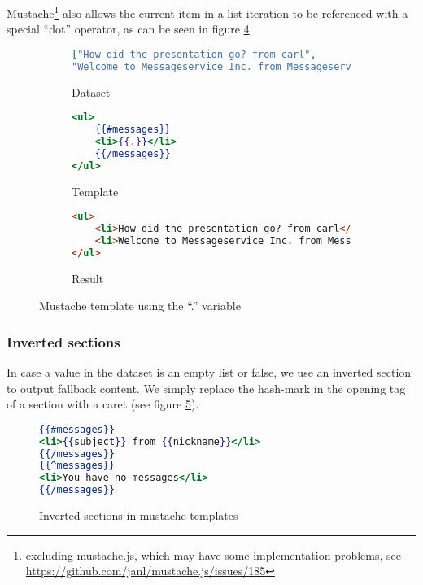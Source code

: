 \documentclass[thesis.tex]{subfiles}
\begin{document}
Mustache\footnote{excluding mustache.js, which may have some implementation
problems, see \url{https://github.com/janl/mustache.js/issues/185}} also allows
the current item in a list iteration to be referenced with a special ``dot''
operator, as can be seen in figure \ref{fig:dot-oper-example}.
\begin{figure}
	\centering
	\begin{subfigure}{\textwidth}
		\caption{Dataset}
		\label{fig:dot-oper-example.json}
		\begin{lstlisting}[language=JSON]
["How did the presentation go? from carl",
"Welcome to Messageservice Inc. from Messageservice Inc."]
		\end{lstlisting}
	\end{subfigure}
	
	\begin{subfigure}{\textwidth}
		\caption{Template}
		\label{fig:dot-oper-example.mustache}
		\begin{lstlisting}[language=mustache]
<ul>
	{{#messages}}
	<li>{{.}}</li>
	{{/messages}}
</ul>
		\end{lstlisting}
	\end{subfigure}
	
	\begin{subfigure}{\textwidth}
		\caption{Result}
		\label{fig:dot-oper-example.html}
		\begin{lstlisting}[language=HTML]
<ul>
	<li>How did the presentation go? from carl</li>
	<li>Welcome to Messageservice Inc. from Messageservice Inc.</li>
</ul>
		\end{lstlisting}
	\end{subfigure}
	\caption{Mustache template using the ``.'' variable}
	\label{fig:dot-oper-example}
\end{figure}

\subsubsection{Inverted sections}
In case a value in the dataset is an empty list or false, we use an inverted
section to output fallback content. We simply replace the hash-mark in the
opening tag of a section with a caret (see figure \ref{fig:inverted.mustache}).
\begin{figure}
	\centering
	\begin{lstlisting}[language=mustache]
{{#messages}}
<li>{{subject}} from {{nickname}}</li>
{{/messages}}
{{^messages}}
<li>You have no messages</li>
{{/messages}}
	\end{lstlisting}
	\caption{Inverted sections in mustache templates}
	\label{fig:inverted.mustache}
\end{figure}
\end{document}
